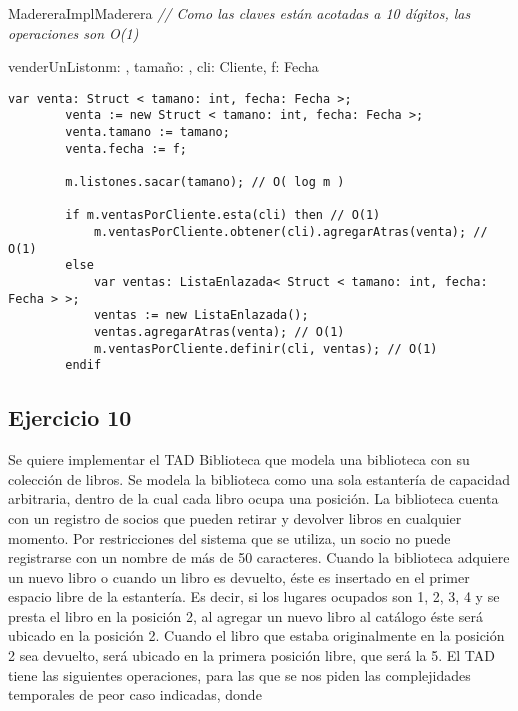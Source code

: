 \begin{module}{MadereraImpl}{}{Maderera}{}
	 \textit{// Como las claves están acotadas a 10 dígitos, las operaciones son O(1)}

	\begin{proc}{venderUnListon}{\Inout m: \moduletype, \In tamaño: \Int, \In cli: Cliente, \In f: Fecha}{}
		\begin{lstlisting}[numbers=none,frame=none]
		var venta: Struct < tamano: int, fecha: Fecha >;
		venta := new Struct < tamano: int, fecha: Fecha >;
		venta.tamano := tamano;
		venta.fecha := f;

		m.listones.sacar(tamano); // O( log m )
		
		if m.ventasPorCliente.esta(cli) then // O(1)
			m.ventasPorCliente.obtener(cli).agregarAtras(venta); // O(1)
		else
			var ventas: ListaEnlazada< Struct < tamano: int, fecha: Fecha > >;
			ventas := new ListaEnlazada();
			ventas.agregarAtras(venta); // O(1)
			m.ventasPorCliente.definir(cli, ventas); // O(1)
		endif
		\end{lstlisting}
	\end{proc}
\end{module}

\subsection{Ejercicio 10}
Se quiere implementar el TAD Biblioteca que modela una biblioteca con su colección de libros. Se modela la biblioteca como una sola estantería de capacidad arbitraria, dentro de la cual cada libro ocupa una posición. La biblioteca cuenta con un registro de socios que pueden retirar y devolver libros en cualquier momento. Por restricciones del sistema que se utiliza, un socio no puede registrarse con un nombre de más de 50 caracteres.
Cuando la biblioteca adquiere un nuevo libro o cuando un libro es devuelto, éste es insertado en el primer espacio libre de la estantería. Es decir, si los lugares ocupados son 1, 2, 3, 4 y se presta el libro en la posición 2, al agregar un nuevo libro al catálogo éste será ubicado en la posición 2. Cuando el libro que estaba originalmente en la posición 2 sea devuelto, será ubicado en la primera posición libre, que será la 5.
El TAD tiene las siguientes operaciones, para las que se nos piden las complejidades temporales de peor caso indicadas, donde

